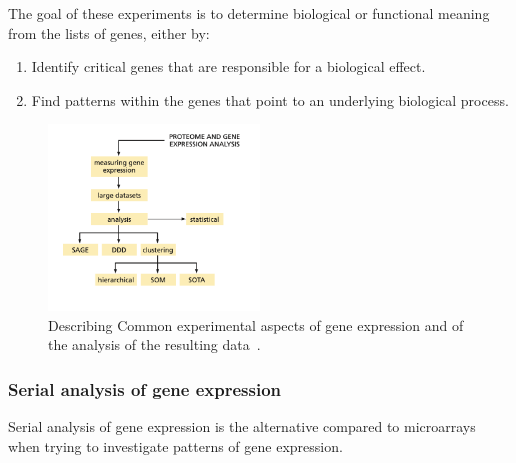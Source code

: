 \documentclass[]{final_report}
\begin{document}
The goal of these experiments is to determine biological or functional meaning from the lists of genes, either by:

\begin{enumerate}
    \item Identify critical genes that are responsible for a biological effect.
    \item Find patterns within the genes that point to an underlying biological process.
\end{enumerate}
\cite{zvelebil_understanding_2008}

\begin{figure}[ht]
    \centering
    \includegraphics[width=0.5\textwidth]{Gene Expresion.png}
    \caption{\label{fig:Gene Expression}Describing Common experimental aspects of gene expression and of the analysis of the resulting data~\cite{zvelebil_understanding_2008}.}
\end{figure}

\subsubsection{Serial analysis of gene expression}

Serial analysis of gene expression is the alternative compared to microarrays when trying to investigate patterns of gene expression.
\end{document}
